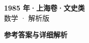 \documentclass[zihao=-4, a4paper]{ctexart}
\begin{document}
\begin{center}
  {\Large\bfseries 1985 年·上海卷·文史类}\\[4pt]
  {\large 数学 · 解析版}
\end{center}
\medskip
{}

\clearpage
{}
\begin{center}{\Large\bfseries 参考答案与详细解析}\end{center}
\medskip

\end{document}
